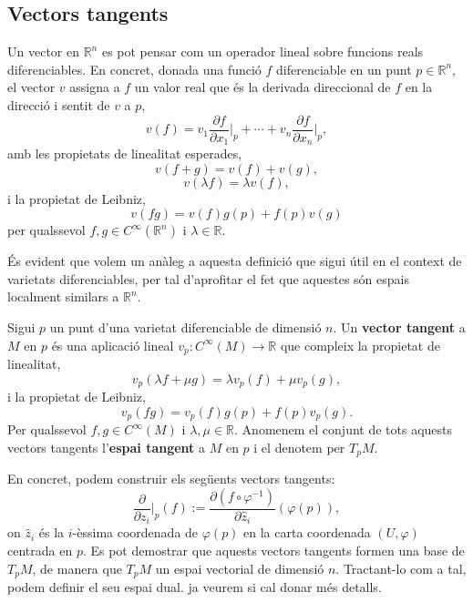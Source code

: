 \subsection{Vectors tangents}
Un vector en $\mathbb R^n$ es pot pensar com un operador lineal sobre funcions reals diferenciables. En concret, donada una funció $f$ diferenciable en un punt $p\in\mathbb R^n$, el vector $v$ assigna a $f$ un valor real que és la derivada direccional de $f$ en la direcció i sentit de $v$ a $p$,
\begin{equation*}
    v(f) = v_1\frac{\partial f}{\partial x_1}\Big|_p + \cdots + v_n\frac{\partial f}{\partial x_n}\Big|_p,
\end{equation*}
amb les propietats de linealitat esperades,
\begin{equation*}
    v(f+g) = v(f) + v(g), 
\end{equation*}
\begin{equation*}
    v(\lambda f) = \lambda v(f),
\end{equation*}
i la propietat de Leibniz,
\begin{equation*}
    v(fg) = v(f)g(p) + f(p)v(g)
\end{equation*}
per qualssevol $f,g\in C^\infty(\mathbb R^n)$ i $\lambda\in\mathbb R$.

És evident que volem un anàleg a aquesta definició que sigui útil en el context de varietats diferenciables, per tal d'aprofitar el fet que aquestes són espais localment similars a $\mathbb R^n$. 

\begin{defi}
    Sigui $p$ un punt d'una varietat diferenciable de dimensió $n$. Un \textbf{vector tangent} a $M$ en $p$ és una aplicació lineal $v_p:C^\infty(M)\to\mathbb R$ que compleix la propietat de linealitat,
    \begin{equation*}
        v_p(\lambda f+\mu g) = \lambda v_p(f) + \mu v_p(g), 
    \end{equation*}
    i la propietat de Leibniz,
    \begin{equation*}
        v_p(fg) = v_p(f)g(p) + f(p)v_p(g).
    \end{equation*}
    Per qualssevol $f,g\in C^\infty(M)$ i $\lambda,\mu\in\mathbb R$.
    Anomenem el conjunt de tots aquests vectors tangents l'\textbf{espai tangent} a $M$ en $p$ i el denotem per $T_pM$.
\end{defi}

En concret, podem construir els següents vectors tangents:
\begin{equation*}
    \frac{\partial}{\partial z_i}\Big|_p(f) := \frac{\partial(f\circ\varphi^{-1})}{\partial \hat z_i}(\varphi(p)),
\end{equation*}
on $\hat z_i$ és la $i$-èssima coordenada de $\varphi(p)$ en la carta coordenada $(U,\varphi)$ centrada en $p$. Es pot demostrar que aquests vectors tangents formen una base de $T_pM$, de manera que $T_pM$ un espai vectorial de dimensió $n$. Tractant-lo com a tal, podem definir el seu espai dual. {\color{blue} ja veurem si cal donar més detalls.}

